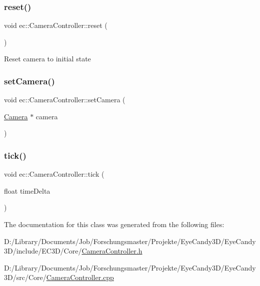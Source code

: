 \mbox{\label{classec_1_1_camera_controller_a10d1642f398f155fa06c4c74961fe91f}} 
\subsubsection{\texorpdfstring{reset()}{reset()}}
{\footnotesize\ttfamily void ec\+::\+Camera\+Controller\+::reset (\begin{DoxyParamCaption}{ }\end{DoxyParamCaption})}

Reset camera to initial state \mbox{\label{classec_1_1_camera_controller_a74d3b80913b69dce0bae61a651c3b49b}} 
\subsubsection{\texorpdfstring{set\+Camera()}{setCamera()}}
{\footnotesize\ttfamily void ec\+::\+Camera\+Controller\+::set\+Camera (\begin{DoxyParamCaption}\item[{\mbox{\hyperlink{classec_1_1_camera}{Camera}} $\ast$}]{camera }\end{DoxyParamCaption})}

\mbox{\label{classec_1_1_camera_controller_a82055ad6c8797937a8ec17234ab08758}} 
\subsubsection{\texorpdfstring{tick()}{tick()}}
{\footnotesize\ttfamily void ec\+::\+Camera\+Controller\+::tick (\begin{DoxyParamCaption}\item[{float}]{time\+Delta }\end{DoxyParamCaption})}



The documentation for this class was generated from the following files\+:\begin{DoxyCompactItemize}
\item 
D\+:/\+Library/\+Documents/\+Job/\+Forschungsmaster/\+Projekte/\+Eye\+Candy3\+D/\+Eye\+Candy3\+D/include/\+E\+C3\+D/\+Core/\mbox{\hyperlink{_camera_controller_8h}{Camera\+Controller.\+h}}\item 
D\+:/\+Library/\+Documents/\+Job/\+Forschungsmaster/\+Projekte/\+Eye\+Candy3\+D/\+Eye\+Candy3\+D/src/\+Core/\mbox{\hyperlink{_camera_controller_8cpp}{Camera\+Controller.\+cpp}}\end{DoxyCompactItemize}
